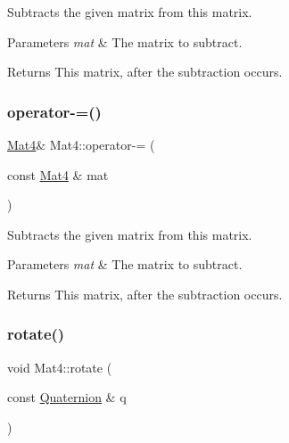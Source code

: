 Subtracts the given matrix from this matrix.


\begin{DoxyParams}{Parameters}
{\em mat} & The matrix to subtract. \\
\hline
\end{DoxyParams}
\begin{DoxyReturn}{Returns}
This matrix, after the subtraction occurs. 
\end{DoxyReturn}
\mbox{\label{classMat4_a2cf11f93e2f8f493ade62f8bd3a849db}} 
\subsubsection{\texorpdfstring{operator-\/=()}{operator-=()}\hspace{0.1cm}{\footnotesize\ttfamily [2/2]}}
{\footnotesize\ttfamily \hyperlink{classMat4}{Mat4}\& Mat4\+::operator-\/= (\begin{DoxyParamCaption}\item[{const \hyperlink{classMat4}{Mat4} \&}]{mat }\end{DoxyParamCaption})\hspace{0.3cm}{\ttfamily [inline]}}

Subtracts the given matrix from this matrix.


\begin{DoxyParams}{Parameters}
{\em mat} & The matrix to subtract. \\
\hline
\end{DoxyParams}
\begin{DoxyReturn}{Returns}
This matrix, after the subtraction occurs. 
\end{DoxyReturn}
\mbox{\label{classMat4_a1cc6787b1cf29ce48df616a6aabe3096}} 
\subsubsection{\texorpdfstring{rotate()}{rotate()}\hspace{0.1cm}{\footnotesize\ttfamily [1/8]}}
{\footnotesize\ttfamily void Mat4\+::rotate (\begin{DoxyParamCaption}\item[{const \hyperlink{classQuaternion}{Quaternion} \&}]{q }\end{DoxyParamCaption})}

